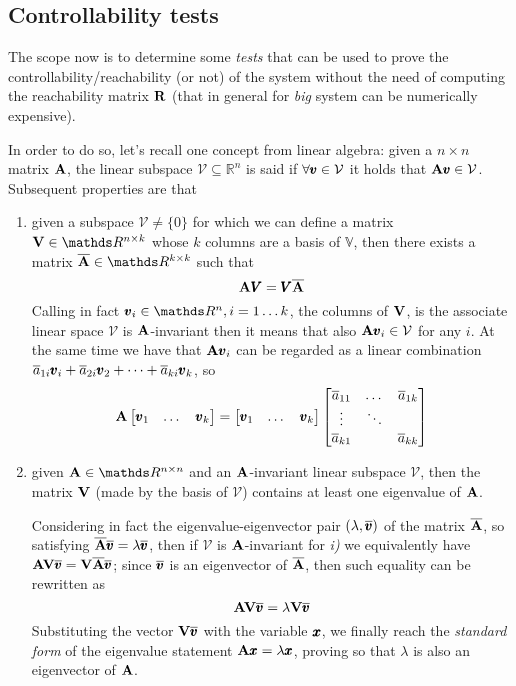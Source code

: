 \subsection{Controllability tests}
	The scope now is to determine some \textit{tests} that can be used to prove the controllability/reachability (or not) of the system without the need of computing the reachability matrix $\mathbf{R}$ (that in general for \textit{big} system can be numerically expensive).
	
	In order to do so, let's recall one concept from linear algebra: given a $n\times n$ matrix $\mathbf{A}$, the linear subspace $\mathcal V \subseteq \mathds R^n$ is said  if $\forall \pmb{v} \in \mathcal V$ it holds that $\mathbf{A} \pmb{v} \in \mathcal V$. Subsequent properties are that
	\begin{enumerate}[\itshape i)]
		\item given a subspace $\mathcal V \neq \{0\}$ for which we can define a matrix $\V \in \mathds R^{n\times k}$ whose $k$ columns are a basis of $\mathds V$, then there exists a matrix $\overline \A\in \mathds R^{k\times k}$ such that
		\[ \mathbf{A} \pmb{V} = \pmb{V} \overline {\mathbf{A}} \]
		Calling in fact $\vet v_i\in \mathds R^n, i=1\dots k$, the columns of $\mathbf{V}$, is the associate linear space $\mathcal V$ is $\mathbf{A}$-invariant then it means that also $\mathbf{A} \pmb{v}_i \in \mathcal V$ for any $i$. At the same time we have that $\mathbf{A}\pmb{v}_i$ can be regarded as a linear combination $\overline a_{1i} \pmb{v}_i + \overline a_{2i} \pmb{v}_2 + \dots + \overline a_{ki} \pmb{v}_k$, so
		\[ \mathbf{A} \begin{bmatrix} \pmb{v}_1 & \dots & \pmb{v}_k \end{bmatrix} = \begin{bmatrix} \pmb{v}_1 & \dots & \pmb{v}_k \end{bmatrix} \begin{bmatrix} \overline a_{11} & \dots & \overline a_{1k} \\ \vdots & \ddots \\ \overline a_{k1} & & \overline a_{kk}  \end{bmatrix} \] 
		
		\item given $\A\in \mathds R^{n\times n}$ and an $\mathbf{A}$-invariant linear subspace $\mathcal V$, then the matrix $\mathbf{V}$ (made by the basis of $\mathcal V$) contains at least one eigenvalue of $\mathbf{A}$.
		
		Considering in fact the eigenvalue-eigenvector pair $(\lambda, \overline{\pmb{v}})$ of the matrix $\overline {\mathbf{A}}$, so satisfying $\overline {\mathbf{A}} \overline {\pmb{v}} = \lambda \overline{\pmb{v}}$, then if $\mathcal V$ is $\mathbf{A}$-invariant for \textit{i)} we equivalently have $\mathbf{A} \mathbf{V} \overline{\pmb{v}} = \mathbf{V} \overline{\mathbf{A}} \overline{\pmb{v}}$; since $\overline{\pmb{v}}$ is an eigenvector of $\overline {\mathbf{A}}$, then such equality can be rewritten as 
		\[ \mathbf{A} \mathbf{V} \overline{\pmb{v}} = \lambda \mathbf{V} \overline{\pmb{v}} \]
		Substituting the vector $\mathbf{V} \overline{\pmb{v}}$ with the variable $\pmb{x}$, we finally reach the \textit{standard form} of the eigenvalue statement $\mathbf{A} \pmb{x} = \lambda \pmb{x}$, proving so that $\lambda$ is also an eigenvector of $\mathbf{A}$.
		
	\end{enumerate}
	

